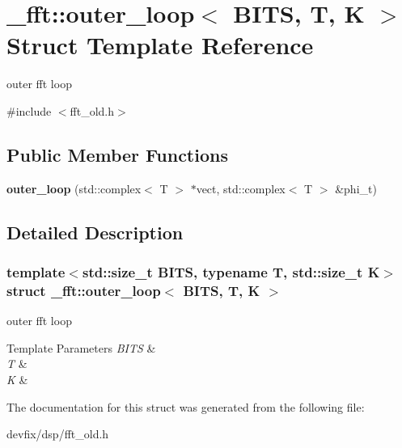 \hypertarget{struct__fft_1_1outer__loop}{}\section{\+\_\+fft\+:\+:outer\+\_\+loop$<$ B\+I\+TS, T, K $>$ Struct Template Reference}
\label{struct__fft_1_1outer__loop}


outer fft loop  




{\ttfamily \#include $<$fft\+\_\+old.\+h$>$}

\subsection*{Public Member Functions}
\begin{DoxyCompactItemize}
\item 
\mbox{\label{struct__fft_1_1outer__loop_ad65e0eb1582270ba89351eb4f75629b5}} 
{\bfseries outer\+\_\+loop} (std\+::complex$<$ T $>$ $\ast$vect, std\+::complex$<$ T $>$ \&phi\+\_\+t)
\end{DoxyCompactItemize}


\subsection{Detailed Description}
\subsubsection*{template$<$std\+::size\+\_\+t B\+I\+TS, typename T, std\+::size\+\_\+t K$>$\newline
struct \+\_\+fft\+::outer\+\_\+loop$<$ B\+I\+T\+S, T, K $>$}

outer fft loop 


\begin{DoxyTemplParams}{Template Parameters}
{\em B\+I\+TS} & \\
\hline
{\em T} & \\
\hline
{\em K} & \\
\hline
\end{DoxyTemplParams}


The documentation for this struct was generated from the following file\+:\begin{DoxyCompactItemize}
\item 
devfix/dsp/fft\+\_\+old.\+h\end{DoxyCompactItemize}

